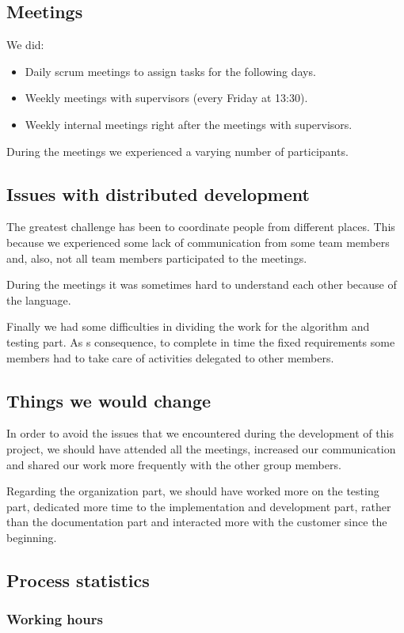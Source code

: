 \subsection{Meetings}
We did:
\begin{itemize}
	\item Daily scrum meetings to assign tasks for the following days. 
	\item Weekly meetings with supervisors (every Friday at 13:30).
	\item Weekly internal meetings right after the meetings with supervisors.
\end{itemize} 
During the meetings we experienced a varying number of participants. 

\subsection{Issues with distributed development}
The greatest challenge has been to coordinate people from different places. This because we experienced some lack of communication from some team members and, also, not all team members participated to the meetings.

During the meetings it was sometimes hard to understand each other because of the language. 

Finally we had some difficulties in dividing the work for the algorithm and testing part. As s consequence, to complete in time the fixed requirements some members had to take care of activities delegated to other members.

\subsection{Things we would change}
In order to avoid the issues that we encountered during the development of this project, we should have attended all the meetings, increased our communication and shared our work more frequently with the other group members.

Regarding the organization part, we should have worked more on the testing part, dedicated more time to the implementation and development part, rather than the documentation part and interacted more with the customer since the beginning.

\newpage
\subsection{Process statistics}
\subsubsection{Working hours}
